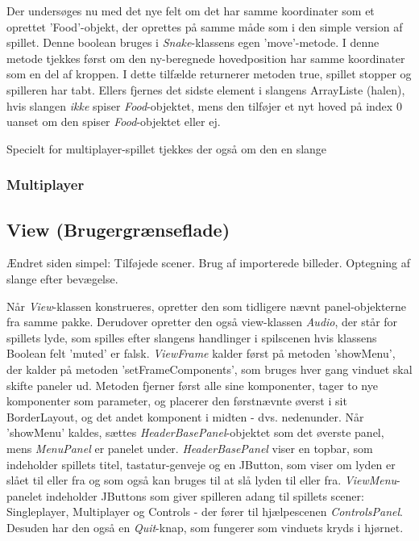 Der undersøges nu med det nye felt om det har samme koordinater som et oprettet 'Food'-objekt, der oprettes på samme måde som i den simple version af spillet. Denne boolean bruges i \textit{Snake}-klassens egen 'move'-metode. I denne metode tjekkes først om den ny-beregnede hovedposition har samme koordinater som en del af kroppen. I dette tilfælde returnerer metoden true, spillet stopper og spilleren har tabt. Ellers fjernes det sidste element i slangens ArrayListe (halen), hvis slangen \textit{ikke} spiser \textit{Food}-objektet, mens den tilføjer et nyt hoved på index 0 uanset om den spiser \textit{Food}-objektet eller ej.

   
Specielt for multiplayer-spillet tjekkes der også om den en slange 

\subsubsection{Multiplayer}

\subsection{View (Brugergrænseflade)}
Ændret siden simpel: Tilføjede scener. Brug af importerede billeder. Optegning af slange efter bevægelse.

Når \textit{View}-klassen konstrueres, opretter den som tidligere nævnt panel-objekterne fra samme pakke. Derudover opretter den også view-klassen \textit{Audio}, der står for spillets lyde, som spilles efter slangens handlinger i spilscenen hvis klassens Boolean felt 'muted' er falsk. \textit{ViewFrame} kalder først på metoden 'showMenu', der kalder på metoden 'setFrameComponents', som bruges hver gang vinduet skal skifte paneler ud. Metoden fjerner først alle sine komponenter, tager to nye komponenter som parameter, og placerer den førstnævnte øverst i sit BorderLayout, og det andet komponent i midten - dvs. nedenunder. Når 'showMenu' kaldes, sættes \textit{HeaderBasePanel}-objektet som det øverste panel, mens \textit{MenuPanel} er panelet under. \textit{HeaderBasePanel} viser en topbar, som indeholder spillets titel, tastatur-genveje og en JButton, som viser om lyden er slået til eller fra og som også kan bruges til at slå lyden til eller fra. \textit{ViewMenu}-panelet indeholder JButtons som giver spilleren adang til spillets scener: Singleplayer, Multiplayer og Controls - der fører til hjælpescenen \textit{ControlsPanel}. Desuden har den også en \textit{Quit}-knap, som fungerer som vinduets kryds i hjørnet. 

